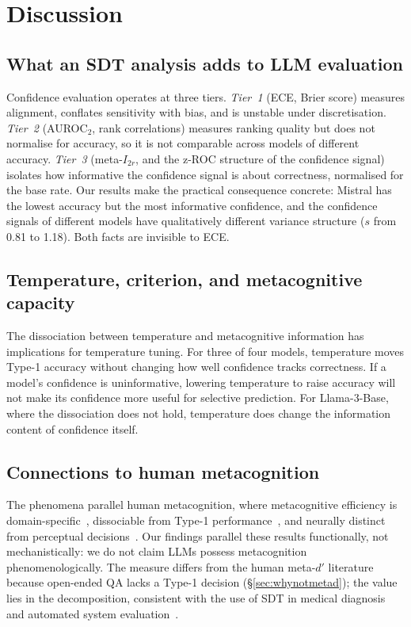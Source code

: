 \documentclass{article}
\begin{document}
\section{Discussion}

\subsection{What an SDT analysis adds to LLM evaluation}

Confidence evaluation operates at three tiers. \emph{Tier~1} (ECE, Brier score) measures alignment, conflates sensitivity with bias, and is unstable under discretisation. \emph{Tier~2} (AUROC$_2$, rank correlations) measures ranking quality but does not normalise for accuracy, so it is not comparable across models of different accuracy. \emph{Tier~3} (meta-$I_{2r}$, and the z-ROC structure of the confidence signal) isolates how informative the confidence signal is about correctness, normalised for the base rate. Our results make the practical consequence concrete: Mistral has the lowest accuracy but the most informative confidence, and the confidence signals of different models have qualitatively different variance structure ($s$ from 0.81 to 1.18). Both facts are invisible to ECE.

\subsection{Temperature, criterion, and metacognitive capacity}

The dissociation between temperature and metacognitive information has implications for temperature tuning. For three of four models, temperature moves Type-1 accuracy without changing how well confidence tracks correctness. If a model's confidence is uninformative, lowering temperature to raise accuracy will not make its confidence more useful for selective prediction. For Llama-3-Base, where the dissociation does not hold, temperature does change the information content of confidence itself.

\subsection{Connections to human metacognition}

The phenomena parallel human metacognition, where metacognitive efficiency is domain-specific~\citep{rouault2018domain}, dissociable from Type-1 performance~\citep{fleming2010relating}, and neurally distinct from perceptual decisions~\citep{fleming2012prefrontal}. Our findings parallel these results functionally, not mechanistically: we do not claim LLMs possess metacognition phenomenologically. The measure differs from the human meta-$d'$ literature because open-ended QA lacks a Type-1 decision (\S\ref{sec:whynotmetad}); the value lies in the decomposition, consistent with the use of SDT in medical diagnosis~\citep{swets1996signal} and automated system evaluation~\citep{bartlett2017evaluating}.
\end{document}
